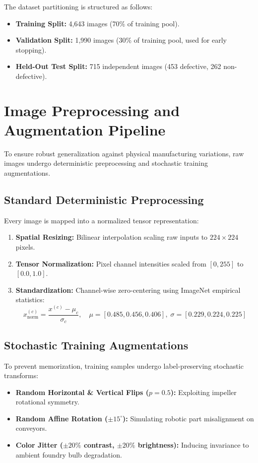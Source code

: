 \documentclass[12pt,a4paper]{report}
\begin{document}
The dataset partitioning is structured as follows:
\begin{itemize}
    \item \textbf{Training Split:} 4,643 images (70\% of training pool).
    \item \textbf{Validation Split:} 1,990 images (30\% of training pool, used for early stopping).
    \item \textbf{Held-Out Test Split:} 715 independent images (453 defective, 262 non-defective).
\end{itemize}

\section{Image Preprocessing and Augmentation Pipeline}
To ensure robust generalization against physical manufacturing variations, raw images undergo deterministic preprocessing and stochastic training augmentations.

\subsection{Standard Deterministic Preprocessing}
Every image is mapped into a normalized tensor representation:
\begin{enumerate}
    \item \textbf{Spatial Resizing:} Bilinear interpolation scaling raw inputs to $224 \times 224$ pixels.
    \item \textbf{Tensor Normalization:} Pixel channel intensities scaled from $[0, 255]$ to $[0.0, 1.0]$.
    \item \textbf{Standardization:} Channel-wise zero-centering using ImageNet empirical statistics:
    \begin{equation}
        x_{\text{norm}}^{(c)} = \frac{x^{(c)} - \mu_c}{\sigma_c}, \quad \mu = [0.485, 0.456, 0.406], \; \sigma = [0.229, 0.224, 0.225]
    \end{equation}
\end{enumerate}

\subsection{Stochastic Training Augmentations}
To prevent memorization, training samples undergo label-preserving stochastic transforms:
\begin{itemize}
    \item \textbf{Random Horizontal \& Vertical Flips ($p=0.5$):} Exploiting impeller rotational symmetry.
    \item \textbf{Random Affine Rotation ($\pm 15^\circ$):} Simulating robotic part misalignment on conveyors.
    \item \textbf{Color Jitter ($\pm 20\%$ contrast, $\pm 20\%$ brightness):} Inducing invariance to ambient foundry bulb degradation.
\end{itemize}
\end{document}
